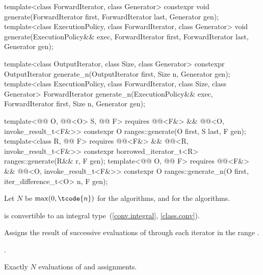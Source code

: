 %
%
\begin{itemdecl}
template<class ForwardIterator, class Generator>
  constexpr void generate(ForwardIterator first, ForwardIterator last,
                          Generator gen);
template<class ExecutionPolicy, class ForwardIterator, class Generator>
  void generate(ExecutionPolicy&& exec,
                ForwardIterator first, ForwardIterator last,
                Generator gen);

template<class OutputIterator, class Size, class Generator>
  constexpr OutputIterator generate_n(OutputIterator first, Size n, Generator gen);
template<class ExecutionPolicy, class ForwardIterator, class Size, class Generator>
  ForwardIterator generate_n(ExecutionPolicy&& exec,
                             ForwardIterator first, Size n, Generator gen);

template<@@ O, @@<O> S, @@ F>
  requires @@<F&> && @@<O, invoke_result_t<F&>>
  constexpr O ranges::generate(O first, S last, F gen);
template<class R, @@ F>
  requires @@<F&> && @@<R, invoke_result_t<F&>>
  constexpr borrowed_iterator_t<R> ranges::generate(R&& r, F gen);
template<@@ O, @@ F>
  requires @@<F&> && @@<O, invoke_result_t<F&>>
  constexpr O ranges::generate_n(O first, iter_difference_t<O> n, F gen);
\end{itemdecl}

\begin{itemdescr}
\pnum
Let $N$ be $\max(0, \tcode{n})$ for the  algorithms, and
 for the  algorithms.

\pnum
\mandates
{} is convertible
to an integral type~(\ref{conv.integral}, \ref{class.conv}).

\pnum
\effects
Assigns the result of successive evaluations of 
through each iterator in the range .

\pnum
\returns
{}.

\pnum
\complexity
Exactly $N$ evaluations of  and assignments.
\end{itemdescr}

